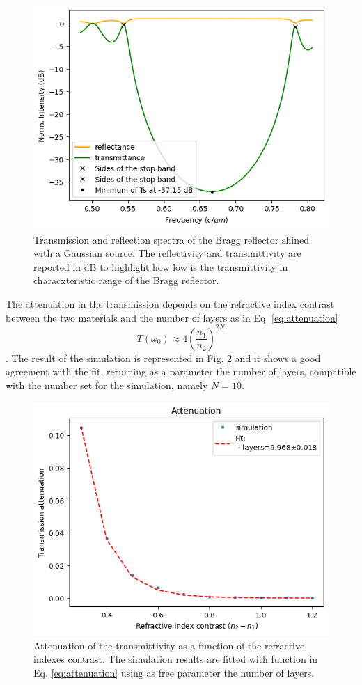 \begin{figure}[H]
    \centering
    \includegraphics[width=0.6\linewidth]{Figures/bragg_spectrum.png}
    \caption{Transmission and reflection spectra of the Bragg reflector shined with a Gaussian source. The reflectivity and transmittivity are reported in dB to highlight how low is the transmittivity in characxteristic range of the Bragg reflector.}
    \label{fig:bragg_spectrum}
\end{figure}

The attenuation in the transmission depends on the refractive index contrast between the two materials and the number of layers as in Eq. \ref{eq:attenuation}
\begin{equation} \label{eq:attenuation}
    T(\omega_0) \approx 4 \left(\frac{n_1}{n_2}\right)^{2N} 
\end{equation}. The result of the simulation is represented in Fig. \ref{fig:bragg_attenuation_vs_index} and it shows a good agreement with the fit, returning as a parameter the number of layers, compatible with the number set for the simulation, namely \(N=10\).

\begin{figure}[H]
    \centering
    \includegraphics[width=0.6\linewidth]{Figures/bragg_attenuation_vs_index.png}
    \caption{Attenuation of the transmittivity as a function of the refractive indexes contrast. The simulation results are fitted with function in Eq. \ref{eq:attenuation} using as free parameter the number of layers.}
    \label{fig:bragg_attenuation_vs_index}
\end{figure}

